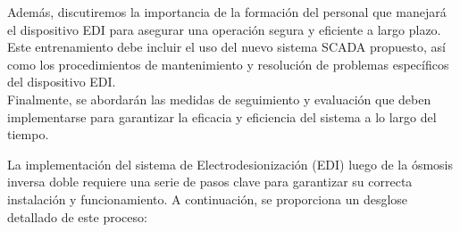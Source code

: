 Además, discutiremos la importancia de la formación del personal que manejará el dispositivo EDI para asegurar una operación segura y eficiente a largo plazo. Este entrenamiento debe incluir el uso del nuevo sistema SCADA propuesto, así como los procedimientos de mantenimiento y resolución de problemas específicos del dispositivo EDI. \\

Finalmente, se abordarán las medidas de seguimiento y evaluación que deben implementarse para garantizar la eficacia y eficiencia del sistema a lo largo del tiempo.

La implementación del sistema de Electrodesionización (EDI) luego de la ósmosis inversa doble requiere una serie de pasos clave para garantizar su correcta instalación y funcionamiento. A continuación, se proporciona un desglose detallado de este proceso:

